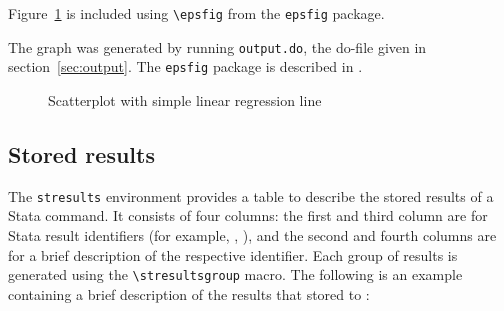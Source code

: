 Figure~\ref{fig} is included using \verb+\epsfig+ from the \texttt{epsfig}
package.  

\noindent
The graph was generated by running \texttt{output.do}, the
do-file given in section~\ref{sec:output}.  The \texttt{epsfig} package is
described in \citet*{latexcompanion}.

\begin{figure}[h!]
\begin{center}
\end{center}
\caption{Scatterplot with simple linear regression line}
\label{fig}
\end{figure}

\subsection{Stored results}

The \texttt{stresults} environment provides a table to describe the stored
results of a Stata command.  It consists of four columns: the first and third
column are for Stata result identifiers (for example, ,
), and the second and fourth columns are for a brief description
of the respective identifier.
%
Each group of results is generated using the \verb+\stresultsgroup+ macro.
%
The following is an example containing a brief description of the results that
 stored to :

